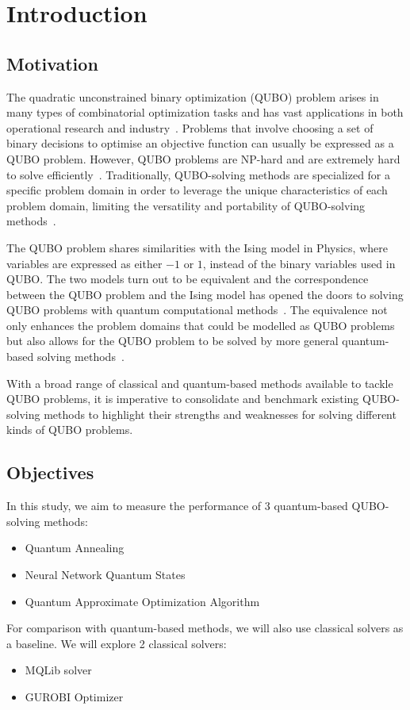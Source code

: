 
\chapter{Introduction}
\vspace{2em}

\section{Motivation}
The quadratic unconstrained binary optimization (QUBO) problem arises in many types of combinatorial optimization tasks and has vast applications in both operational research and industry~\cite{b1}. Problems that involve choosing a set of binary decisions to optimise an objective function can usually be expressed as a QUBO problem. However, QUBO problems are NP-hard and are extremely hard to solve efficiently~\cite{b1}. Traditionally, QUBO-solving methods are specialized for a specific problem domain in order to leverage the unique characteristics of each problem domain, limiting the versatility and portability of QUBO-solving methods~\cite{b5}.

The QUBO problem shares similarities with the Ising model in Physics, where variables are expressed as either $-1$ or $1$, instead of the binary variables used in QUBO. The two models turn out to be equivalent and the correspondence between the QUBO problem and the Ising model has opened the doors to solving QUBO problems with quantum computational methods~\cite{b5}. The equivalence not only enhances the problem domains that could be modelled as QUBO problems but also allows for the QUBO problem to be solved by more general quantum-based solving methods~\cite{b5}.

With a broad range of classical and quantum-based methods available to tackle QUBO problems, it is imperative to consolidate and benchmark existing QUBO-solving methods to highlight their strengths and weaknesses for solving different kinds of QUBO problems.

\section{Objectives}
In this study, we aim to measure the performance of 3 quantum-based QUBO-solving methods:
\begin{itemize}
    \item Quantum Annealing
    \item Neural Network Quantum States
    \item Quantum Approximate Optimization Algorithm
\end{itemize}
For comparison with quantum-based methods, we will also use classical solvers as a baseline. We will explore 2 classical solvers:
\begin{itemize}
    \item MQLib solver
    \item GUROBI Optimizer
\end{itemize}

